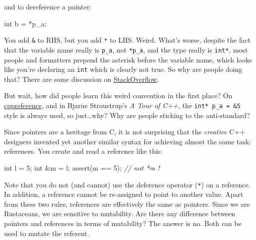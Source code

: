 \documentclass[
]{book}
\newenvironment{Shaded}{\begin{snugshade}}{\end{snugshade}}
\newcommand{\CommentTok}[1]{\textcolor[rgb]{0.56,0.35,0.01}{\textit{#1}}}
\newcommand{\DataTypeTok}[1]{\textcolor[rgb]{0.13,0.29,0.53}{#1}}
\newcommand{\DecValTok}[1]{\textcolor[rgb]{0.00,0.00,0.81}{#1}}
\newcommand{\NormalTok}[1]{#1}
\newcommand{\OtherTok}[1]{\textcolor[rgb]{0.56,0.35,0.01}{#1}}
\begin{document}
and to dereference a pointer:

\begin{Shaded}
\begin{Highlighting}[]
\DataTypeTok{int}\NormalTok{ b = *p\_a;}
\end{Highlighting}
\end{Shaded}

You add \texttt{\&} to RHS, but you add \texttt{*} to LHS. Weird. What's worse, despite the fact that the variable name really is \texttt{p\_a}, not \texttt{*p\_a}, and the type really is \texttt{int*}, most people and formatters prepend the asterisk before the variable name, which looks like you're declaring an \texttt{int} which is clearly not true. So why are people doing that? There are some discussion on \href{https://stackoverflow.com/questions/398395/why-is-the-asterisk-before-the-variable-name-rather-than-after-the-type}{StackOverflow}.

But wait, how did people learn this weird convention in the first place? On \href{https://en.cppreference.com/w/cpp/language/pointer}{cppreference}, and in Bjarne Stroustrup's \emph{A Tour of C++}, the \texttt{int*\ p\_a\ =\ \&5} style is always used, so just\ldots why? Why are people sticking to the anti-standard?

Since pointers are a heritage from C, it is not surprising that the \emph{creative} C++ designers invented yet another similar syntax for achieving almost the same task: references. You create and read a reference like this:

\begin{Shaded}
\begin{Highlighting}[]
\DataTypeTok{int}\NormalTok{ l = }\DecValTok{5}\NormalTok{;}
\DataTypeTok{int}\NormalTok{ \&m = l;}
\OtherTok{assert}\NormalTok{(m == }\DecValTok{5}\NormalTok{); }\CommentTok{// not \textasciigrave{}*m\textasciigrave{} !}
\end{Highlighting}
\end{Shaded}

Note that you do not (and cannot) use the deference operator (\texttt{*}) on a reference. In addition, a reference cannot be re-assigned to point to another value. Apart from these two rules, references are effectively the same as pointers.
Since we are Rustaceans, we are sensitive to mutability. Are there any difference between pointers and references in terms of mutability? The answer is no. Both can be used to mutate the referent.
\end{document}
